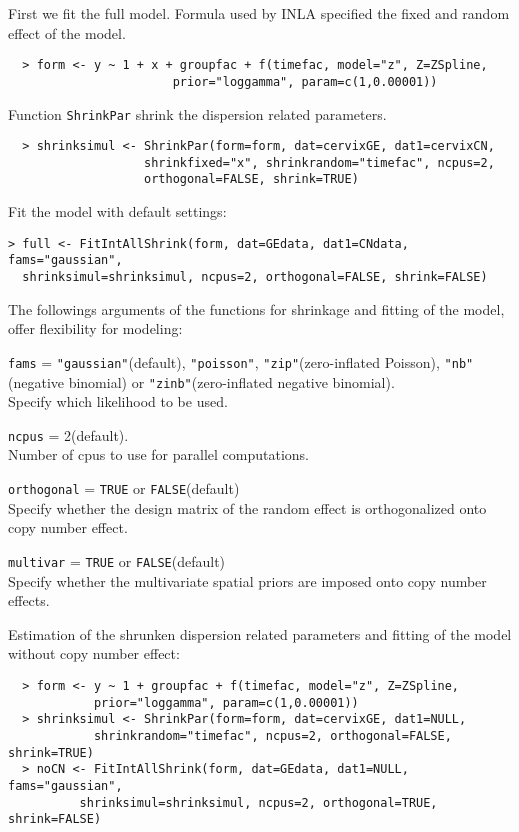 \documentclass[a4paper]{article}
\begin{document}
First we fit the full model. Formula used by INLA specified the fixed and random effect of the model.
\begin{verbatim}
  > form <- y ~ 1 + x + groupfac + f(timefac, model="z", Z=ZSpline,
                       prior="loggamma", param=c(1,0.00001))
\end{verbatim}
Function {\tt ShrinkPar} shrink the dispersion related parameters.
\begin{verbatim}
  > shrinksimul <- ShrinkPar(form=form, dat=cervixGE, dat1=cervixCN,
                   shrinkfixed="x", shrinkrandom="timefac", ncpus=2,
                   orthogonal=FALSE, shrink=TRUE)
\end{verbatim}  
Fit the model with default settings:
\begin{verbatim}  
> full <- FitIntAllShrink(form, dat=GEdata, dat1=CNdata, fams="gaussian",
  shrinksimul=shrinksimul, ncpus=2, orthogonal=FALSE, shrink=FALSE)
\end{verbatim}  
The followings arguments of the functions for shrinkage and fitting of the model, offer flexibility for modeling:
\begin{compactitem}
\item {\tt fams} =  {\tt "gaussian"}(default), {\tt "poisson"}, {\tt "zip"}(zero-inflated Poisson), {\tt "nb"}(negative binomial) or {\tt "zinb"}(zero-inflated negative binomial).\\
 Specify which likelihood to be used. 
\item {\tt ncpus} = 2(default).\\
 Number of cpus to use for parallel computations. 
\item {\tt orthogonal} = {\tt TRUE} or {\tt FALSE}(default) \\
 Specify whether the design matrix of the random effect is orthogonalized onto copy number effect.
\item {\tt multivar} = {\tt TRUE} or {\tt FALSE}(default)\\
 Specify whether the multivariate spatial priors are imposed onto copy number effects.
\end{compactitem}

Estimation of the shrunken dispersion related parameters and fitting of the model without copy number effect:
\begin{verbatim}
  > form <- y ~ 1 + groupfac + f(timefac, model="z", Z=ZSpline,
            prior="loggamma", param=c(1,0.00001))
  > shrinksimul <- ShrinkPar(form=form, dat=cervixGE, dat1=NULL, 
            shrinkrandom="timefac", ncpus=2, orthogonal=FALSE, shrink=TRUE)
  > noCN <- FitIntAllShrink(form, dat=GEdata, dat1=NULL, fams="gaussian",
          shrinksimul=shrinksimul, ncpus=2, orthogonal=TRUE, shrink=FALSE)
\end{verbatim}
\end{document}
